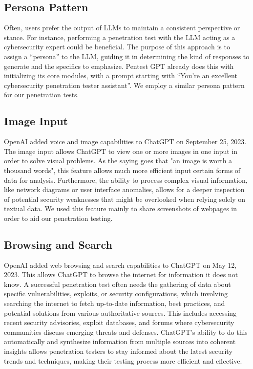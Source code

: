 \documentclass[conference]{IEEEtran}
\begin{document}
\subsection{Persona Pattern} \label{ssec:persona}
Often, users prefer the output of LLMs to maintain a consistent perspective or stance. For instance, performing a penetration test with the LLM acting as a cybersecurity expert could be beneficial. The purpose of this approach is to assign a “persona” to the LLM, guiding it in determining the kind of responses to generate and the specifics to emphasize\cite{white2023prompt}. Pentest GPT already does this with initializing its core modules, with a prompt starting with “You're an excellent cybersecurity penetration tester assistant”\cite{deng2023pentestgpt}. We employ a similar persona pattern for our penetration tests.

\subsection{Image Input} \label{ssec:image}
OpenAI added voice and image capabilities to ChatGPT on September 25, 2023\cite{releasenotes}. The image input allows ChatGPT to view one or more images in one input in order to solve visual problems. As the saying goes that "an image is worth a thousand words", this feature allows much more efficient input certain forms of data for analysis. Furthermore, the ability to process complex visual information, like network diagrams or user interface anomalies, allows for a deeper inspection of potential security weaknesses that might be overlooked when relying solely on textual data. We used this feature mainly to share screenshots of webpages in order to aid our penetration testing.

\subsection{Browsing and Search} \label{ssec:browsing}
OpenAI added web browsing and search capabilities to ChatGPT on May 12, 2023\cite{releasenotes}. This allows ChatGPT to browse the internet for information it does not know. A successful penetration test often needs the gathering of data about specific vulnerabilities, exploits, or security configurations, which involving searching the internet to fetch up-to-date information, best practices, and potential solutions from various authoritative sources. This includes accessing recent security advisories, exploit databases, and forums where cybersecurity communities discuss emerging threats and defenses. ChatGPT's ability to do this automatically and synthesize information from multiple sources into coherent insights allows penetration testers to stay informed about the latest security trends and techniques, making their testing process more efficient and effective. 
\end{document}
